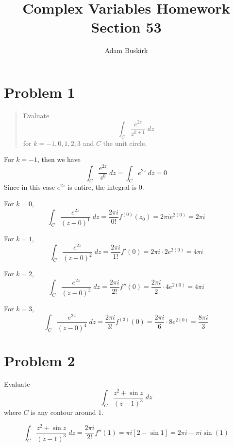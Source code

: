 \documentclass{article}
\title{Complex Variables Homework Section 53}
\author{Adam Buskirk}
\theoremstyle{definition}
\newcommand{\sq}[1]{\left[#1\right]}
\begin{document}
\maketitle

\section{Problem 1}
\begin{quotation}
Evaluate
\[
\int_C \frac{e^{2z}}{z^{k+1}} \;dz
\]
for $k=-1,0,1,2,3$ and $C$ the unit circle.
\end{quotation}

For $k=-1$, then we have
\[ 
\int_C \frac{e^{2z}}{z^0} \;dz 
= \int_C e^{2z} \;dz
= 0
\]
Since in this case $e^{2z}$ is entire, the integral is $0$.

For $k=0$, 
\[
\int_C \frac{e^{2z}}{(z-0)^1} \;dz
= \frac{2\pi i}{0!} f^{(0)}(z_0)
= 2 \pi i e^{2(0)}
= 2 \pi i
\]

For $k=1$,
\[
\int_C \frac{e^{2z}}{(z-0)^2} \;dz
= \frac{2 \pi i}{1!} f'(0)
= 2 \pi i \cdot 2 e^{2(0)}
= 4 \pi i
\]

For $k=2$,
\[
\int_C \frac{e^{2z}}{(z-0)^3} \;dz
= \frac{2 \pi i}{2!} f''(0)
= \frac{2 \pi i}{2} \cdot 4 e^{2(0)}
= 4 \pi i
\]

For $k=3$,
\[
\int_C \frac{e^{2z}}{(z-0)^4} \;dz
= \frac{2 \pi i}{3!} f^{(3)}(0)
= \frac{2 \pi i}{6} \cdot 8 e^{2(0)}
= \frac{8 \pi i}{3}
\]

\section{Problem 2}
Evaluate
\[
\int_C \frac{z^2+\sin z}{(z-1)^3} \;dz
\]
where $C$ is any contour around $1$.

\[ 
\int_C \frac{z^2 + \sin z}{(z-1)^3} \;dz
= \frac{2 \pi i}{2!} f''(1)
= \pi i \sq{2-\sin 1}
= 2\pi i - \pi  i \sin(1)
\]
\end{document}
